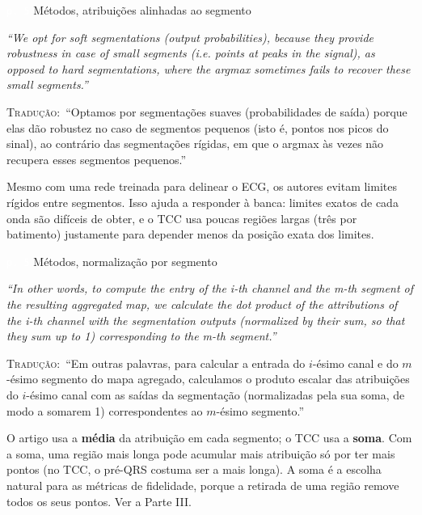 \documentclass[11pt,a4paper]{article}
\newcommand{\pagechip}[1]{{\setlength{\fboxsep}{1.5pt}\colorbox{cAcc}{\textcolor{white}{\scriptsize\texttt{#1}}}}}
\newenvironment{origquote}{\par\itshape\small}{\par}
\newenvironment{tradquote}{\par\small\textsc{Tradução:}\ }{\par}
\newcommand{\explab}[1]{\par\smallskip{\small\color{cAcc}\textbf{\MakeUppercase{#1}}}\par}
\begin{document}
\begin{citacard}{\pagechip{p. 5} Métodos, atribuições alinhadas ao segmento}
\begin{origquote}“We opt for soft segmentations (output probabilities), because they provide robustness in case of small segments (i.e. points at peaks in the signal), as opposed to hard segmentations, where the argmax sometimes fails to recover these small segments.”\end{origquote}
\begin{tradquote}“Optamos por segmentações suaves (probabilidades de saída) porque elas dão robustez no caso de segmentos pequenos (isto é, pontos nos picos do sinal), ao contrário das segmentações rígidas, em que o argmax às vezes não recupera esses segmentos pequenos.”\end{tradquote}
\explab{Explicação}
Mesmo com uma rede treinada para delinear o ECG, os autores evitam limites rígidos entre segmentos. Isso ajuda a responder à banca: limites exatos de cada onda são difíceis de obter, e o TCC usa poucas regiões largas (três por batimento) justamente para depender menos da posição exata dos limites.
\end{citacard}

\begin{citacard}{\pagechip{p. 5} Métodos, normalização por segmento}
\begin{origquote}“In other words, to compute the entry of the i-th channel and the m-th segment of the resulting aggregated map, we calculate the dot product of the attributions of the i-th channel with the segmentation outputs (normalized by their sum, so that they sum up to 1) corresponding to the m-th segment.”\end{origquote}
\begin{tradquote}“Em outras palavras, para calcular a entrada do $i$-ésimo canal e do $m$-ésimo segmento do mapa agregado, calculamos o produto escalar das atribuições do $i$-ésimo canal com as saídas da segmentação (normalizadas pela sua soma, de modo a somarem 1) correspondentes ao $m$-ésimo segmento.”\end{tradquote}
\explab{Explicação}
O artigo usa a \textbf{média} da atribuição em cada segmento; o TCC usa a \textbf{soma}. Com a soma, uma região mais longa pode acumular mais atribuição só por ter mais pontos (no TCC, o pré-QRS costuma ser a mais longa). A soma é a escolha natural para as métricas de fidelidade, porque a retirada de uma região remove todos os seus pontos. Ver a Parte III.
\end{citacard}
\end{document}
